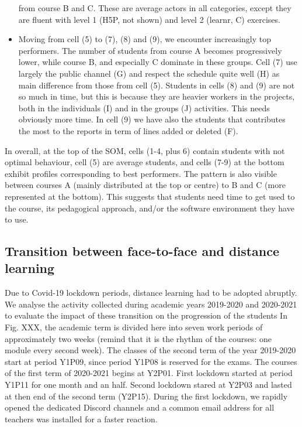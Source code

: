 \documentclass[
]{article}
\begin{document}
\begin{itemize}
  from course B and C. These are average actors in all categories,
  except they are fluent with level 1 (H5P, not shown) and level 2
  (learnr, C) exercises.
\item
  Moving from cell (5) to (7), (8) and (9), we encounter increasingly
  top performers. The number of students from course A becomes
  progressively lower, while course B, and especially C dominate in
  these groups. Cell (7) use largely the public channel (G) and respect
  the schedule quite well (H) as main difference from those from cell
  (5). Students in cells (8) and (9) are not so much in time, but this
  is because they are heavier workers in the projects, both in the
  individuals (I) and in the groups (J) activities. This needs obviously
  more time. In cell (9) we have also the students that contributes the
  most to the reports in term of lines added or deleted (F).
\end{itemize}

In overall, at the top of the SOM, cells (1-4, plus 6) contain students
with not optimal behaviour, cell (5) are average students, and cells
(7-9) at the bottom exhibit profiles corresponding to best performers.
The pattern is also visible between courses A (mainly distributed at the
top or centre) to B and C (more represented at the bottom). This
suggests that students need time to get used to the course, its
pedagogical approach, and/or the software environment they have to use.

\hypertarget{transition-between-face-to-face-and-distance-learning}{%
\subsection{Transition between face-to-face and distance
learning}\label{transition-between-face-to-face-and-distance-learning}}

Due to Covid-19 lockdown periods, distance learning had to be adopted
abruptly. We analyse the activity collected during academic years
2019-2020 and 2020-2021 to evaluate the impact of these transition on
the progression of the students In Fig. XXX, the academic term is
divided here into seven work periods of approximately two weeks (remind
that it is the rhythm of the courses: one module every second week). The
classes of the second term of the year 2019-2020 start at period Y1P09,
since period Y1P08 is reserved for the exams. The courses of the first
term of 2020-2021 begins at Y2P01. First lockdown started at period
Y1P11 for one month and an half. Second lockdown stared at Y2P03 and
lasted at then end of the second term (Y2P15). During the first
lockdown, we rapidly opened the dedicated Discord channels and a common
email address for all teachers was installed for a faster reaction.
\end{document}
